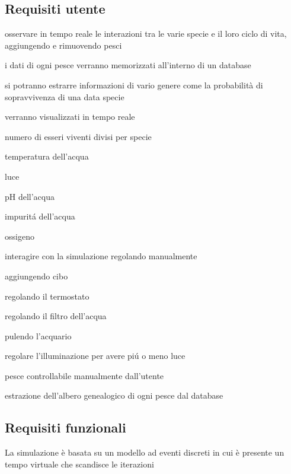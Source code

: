 \documentclass[12pt,a4paper,oneside,article]{article}
\begin{document}
	\subsection{Requisiti utente}
	\begin{legal}[label*=2.\arabic*.]
    	\item osservare in tempo reale le interazioni tra le varie specie e il loro ciclo di vita, aggiungendo e rimuovendo pesci
    	\item i dati di ogni pesce verranno memorizzati all’interno di un database
    	\item si potranno estrarre informazioni di vario genere come la probabilità di sopravvivenza di una data specie
    	\item verranno visualizzati in tempo reale
    	\begin{legal}
    		\item numero di esseri viventi divisi per specie
    		\item temperatura dell’acqua
    		\item luce
    		\item pH dell’acqua
    		\item impurit\'a dell’acqua
    		\item ossigeno
    	\end{legal}
    	\item interagire con la simulazione regolando manualmente
    	\begin{legal}
    		\item aggiungendo cibo
    		\item regolando il termostato
    		\item regolando il filtro dell’acqua
    		\item pulendo l’acquario
    		\item regolare l’illuminazione per avere pi\'u o meno luce
    	\end{legal}
    	\item pesce controllabile manualmente dall’utente
    	\item estrazione dell’albero genealogico di ogni pesce dal database
    \end{legal}
    
    \subsection{Requisiti funzionali}
    \begin{legal}[label*=3.\arabic*.]
    	\item La simulazione è basata su un modello ad eventi discreti in cui è presente un tempo virtuale che scandisce le iterazioni
    \end{legal}
\end{document}
